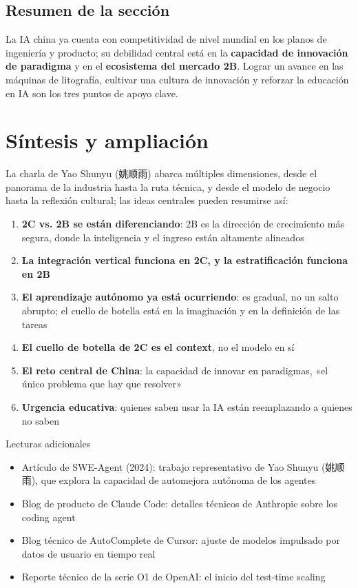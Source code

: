\documentclass[a4paper]{article}
\begin{document}
\subsection{Resumen de la sección}

La IA china ya cuenta con competitividad de nivel mundial en los planos de ingeniería y producto; su debilidad central está en la \textbf{capacidad de innovación de paradigma} y en el \textbf{ecosistema del mercado 2B}. Lograr un avance en las máquinas de litografía, cultivar una cultura de innovación y reforzar la educación en IA son los tres puntos de apoyo clave.

\section{Síntesis y ampliación}

La charla de Yao Shunyu (姚顺雨) abarca múltiples dimensiones, desde el panorama de la industria hasta la ruta técnica, y desde el modelo de negocio hasta la reflexión cultural; las ideas centrales pueden resumirse así:

\begin{enumerate}
\item \textbf{2C vs. 2B se están diferenciando}: 2B es la dirección de crecimiento más segura, donde la inteligencia y el ingreso están altamente alineados
\item \textbf{La integración vertical funciona en 2C, y la estratificación funciona en 2B}
\item \textbf{El aprendizaje autónomo ya está ocurriendo}: es gradual, no un salto abrupto; el cuello de botella está en la imaginación y en la definición de las tareas
\item \textbf{El cuello de botella de 2C es el context}, no el modelo en sí
\item \textbf{El reto central de China}: la capacidad de innovar en paradigmas, «el único problema que hay que resolver»
\item \textbf{Urgencia educativa}: quienes saben usar la IA están reemplazando a quienes no saben
\end{enumerate}

\begin{knowledgebox}{Lecturas adicionales}
\begin{itemize}
\item Artículo de SWE-Agent (2024): trabajo representativo de Yao Shunyu (姚顺雨), que explora la capacidad de automejora autónoma de los agentes
\item Blog de producto de Claude Code: detalles técnicos de Anthropic sobre los coding agent
\item Blog técnico de AutoComplete de Cursor: ajuste de modelos impulsado por datos de usuario en tiempo real
\item Reporte técnico de la serie O1 de OpenAI: el inicio del test-time scaling
\end{itemize}
\end{knowledgebox}

\end{document}
